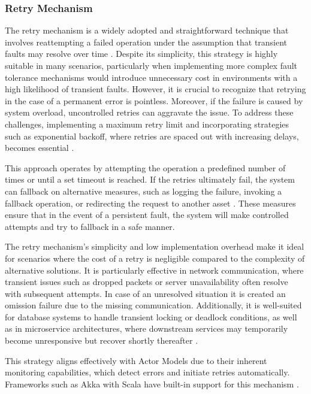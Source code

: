 \subsubsection{Retry Mechanism}

The retry mechanism is a widely adopted and straightforward technique that involves reattempting a failed operation under the assumption that transient faults may resolve over time \cite{Ledmi2018}. Despite its simplicity, this strategy is highly suitable in many scenarios, particularly when implementing more complex fault tolerance mechanisms would introduce unnecessary cost in environments with a high likelihood of transient faults. However, it is crucial to recognize that retrying in the case of a permanent error is pointless. Moreover, if the failure is caused by system overload, uncontrolled retries can aggravate the issue. To address these challenges, implementing a maximum retry limit and incorporating strategies such as exponential backoff, where retries are spaced out with increasing delays, becomes essential \cite{Kleppmann2017,Vitillo2021}.

This approach operates by attempting the operation a predefined number of times or until a set timeout is reached. If the retries ultimately fail, the system can fallback on alternative measures, such as logging the failure, invoking a fallback operation, or redirecting the request to another asset \cite{Isukapalli2024}. These measures ensure that in the event of a persistent fault, the system will make controlled attempts and try to fallback in a safe manner.

The retry mechanism’s simplicity and low implementation overhead make it ideal for scenarios where the cost of a retry is negligible compared to the complexity of alternative solutions. It is particularly effective in network communication, where transient issues such as dropped packets or server unavailability often resolve with subsequent attempts. In case of an unresolved situation it is created an omission failure due to the missing communication. Additionally, it is well-suited for database systems to handle transient locking or deadlock conditions, as well as in microservice architectures, where downstream services may temporarily become unresponsive but recover shortly thereafter \cite{Kleppmann2017}.

This strategy aligns effectively with Actor Models due to their inherent monitoring capabilities, which detect errors and initiate retries automatically. Frameworks such as Akka with Scala have built-in support for this mechanism \cite{Isukapalli2024}.

